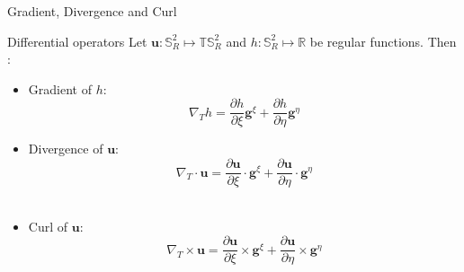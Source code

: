 \documentclass[11pt]{beamer}
\begin{document}


\begin{frame}{Gradient, Divergence and Curl}

\begin{block}{Differential operators}
Let $\mathbf{u} : \mathbb{S}_R^2 \mapsto \mathbb{T}\mathbb{S}_R^2$ and $h : \mathbb{S}_R^2 \mapsto \mathbb{R}$ be regular functions. Then :
\begin{itemize}
\item Gradient of $h$:
\begin{equation}
\nabla_T h = \dfrac{\partial h}{\partial \xi} \mathbf{g}^{\xi} + \dfrac{\partial h}{\partial \eta} \mathbf{g}^{\eta}
\end{equation}
\item Divergence of $\mathbf{u}$:
\begin{equation}
\nabla_T \cdot \mathbf{u} = \dfrac{\partial \mathbf{u}}{\partial \xi}\cdot \mathbf{g}^{\xi} + \dfrac{\partial \mathbf{u}}{\partial \eta} \cdot \mathbf{g}^{\eta}
\end{equation}\\
\item Curl of $\mathbf{u}$:
\begin{equation}
\nabla_T \times \mathbf{u} = \dfrac{\partial \mathbf{u}}{\partial \xi}\times \mathbf{g}^{\xi} + \dfrac{\partial \mathbf{u}}{\partial \eta} \times \mathbf{g}^{\eta}
\end{equation}

\end{itemize}

\end{block}
\end{frame}


%
\end{document}
